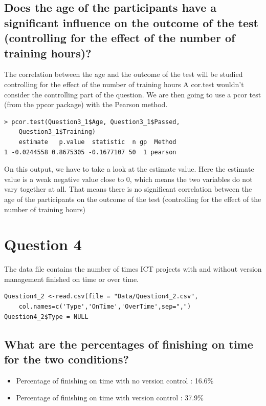 \documentclass[12pt,a4paper]{scrartcl}
\begin{document}
\subsection{Does the age of the participants have a significant influence on the outcome of the test (controlling for the effect of the number of training hours)?}
The correlation between the age and the outcome of the test will be studied controlling for the effect of the number of training hours
A cor.test wouldn't consider the controlling part of the question. We are then going to use a pcor test (from the ppcor package) with the Pearson method.

\begin{lstlisting}[frame=single]
> pcor.test(Question3_1$Age, Question3_1$Passed,
    Question3_1$Training)
    estimate   p.value  statistic  n gp  Method
1 -0.0244558 0.8675305 -0.1677107 50  1 pearson
\end{lstlisting}
On this output, we have to take a look at the estimate value. Here the estimate value is a weak negative value close to 0, which means the two variables do not vary together at all. That means there is no significant correlation between the age of the participants on the outcome of the test (controlling for the effect of the number of training hours)

\pagebreak{}
\section{Question 4}

The data file contains the number of times ICT projects with and without version management finished on time or over time.
\begin{lstlisting}[frame=single]
Question4_2 <-read.csv(file = "Data/Question4_2.csv",
    col.names=c('Type','OnTime','OverTime',sep=",")
Question4_2$Type = NULL
\end{lstlisting}


\subsection{What are the percentages of finishing on time for the two conditions?}
\begin{itemize}
\item{Percentage of finishing on time with no version control : 16.6\%}
\item{Percentage of finishing on time with version control : 37.9\%}
\end{itemize}
\end{document}
